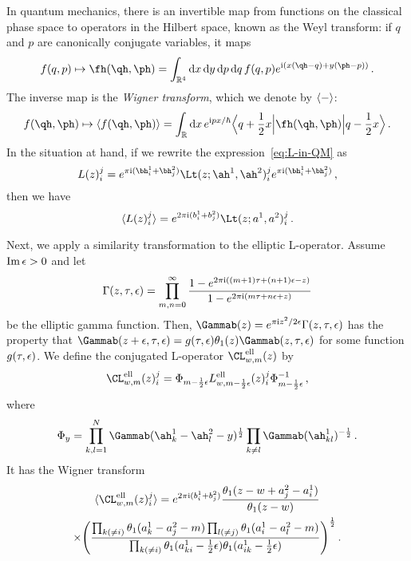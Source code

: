 In quantum mechanics, there is an invertible map from functions on the
classical phase space to operators in the Hilbert space, known as the
Weyl transform: if $q$ and $p$ are canonically conjugate variables, it
maps
\begin{equation}
  f(q,p)
  \mapsto
  \fh(\qh,\ph)
  =
  \int_{\R^4}
  \rmd x \, \rmd y \, \rmd p \, \rmd q \, 
  f(q,p)
  e^{\iu(x(\qh - q) + y(\ph - p))} \,.
\end{equation}
The inverse map is the \emph{Wigner transform}, which we denote by
$\langle - \rangle$:
\begin{equation}
  f(\qh,\ph)
  \mapsto
  \vev{f(\qh,\ph)}
  = \int_\R \rmd x \, e^{\iu px/\hbar}
  \Bigbra{q + \frac12 x} \fh(\qh,\ph) \Bigket{q - \frac12 x} \,.
\end{equation}
In the situation at hand, if we rewrite the
expression~\eqref{eq:L-in-QM} as
\begin{equation}
  L(z)_i^j
  =
  e^{\pi\iu(\bh_i^1 + \bh_j^2)}
  \Lt(z; \ah^1, \ah^2)_i^j
  e^{\pi\iu(\bh_i^1 + \bh_j^2)}
  \,,
\end{equation}
then we have
\begin{equation}
  \vev{L(z)_i^j}
  =
  e^{2\pi\iu(b_i^1 + b_j^2)} \Lt(z; a^1, a^2)_i^j \,.
\end{equation}

Next, we apply a similarity transformation to the elliptic L-operator.
Assume $\mathop{\mathrm{Im}}\nolimits\epsilon > 0$ and let
\begin{equation}
  \Gamma(z,\tau,\epsilon)
  =
  \prod_{m,n=0}^\infty
  \frac{1 - e^{2\pi\mathrm{i}((m+1)\tau + (n+1)\epsilon - z)}}
       {1 - e^{2\pi\mathrm{i}(m\tau + n\epsilon + z)}}
\end{equation}
be the elliptic gamma function.  Then,
$\Gammab(z) = e^{\pi\iu z^2/2\eps} \Gamma(z,\tau,\eps)$ has the
property that
$\Gammab(z + \eps, \tau,\eps) = g(\tau,\eps) \theta_1(z) \Gammab(z,
\tau,\eps)$ for some function $g(\tau,\epsilon)$.  We define the
conjugated L-operator $\CL^{\text{ell}}_{w,m}(z)$ by
\begin{equation}
  \CL^{\text{ell}}_{w,m}(z)_i^j
  =
  \Phi_{m-\frac12\eps}
  L^{\text{ell}}_{w,m - \frac12\eps}(z)_i^j
  \Phi_{m-\frac12\eps}^{-1} \,,
\end{equation}
where
\begin{equation}
  \Phi_y
  =
  \prod_{k,l=1}^N \Gammab(\ah^1_k - \ah^2_l - y)^{\frac12}
  \prod_{k \neq l} \Gammab(\ah^1_{kl})^{-\frac12} \,.
\end{equation}
It has the Wigner transform
\begin{multline}
  \vev{\CL^{\text{ell}}_{w,m}(z)_i^j}
  =
  e^{2\pi\iu(b_i^1 + b_j^2)}
  \frac{\theta_1(z - w + a^2_j - a^1_i)}{\theta_1(z - w)}
  \\
  \times
  \Biggl(
  \frac{\prod_{k (\neq i)} \theta_1(a^1_k - a^2_j - m)
        \prod_{l (\neq j)} \theta_1(a^1_i - a^2_l - m)}
       {\prod_{k (\neq i)}\theta_1(a^1_{ki} - \frac12\eps)
        \theta_1(a^1_{ik} - \frac12\eps)}
  \Biggr)^{\frac12}
  \,.
\end{multline}

